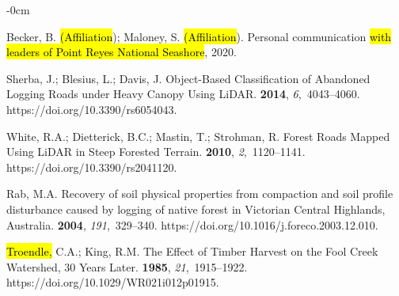 \documentclass[remotesensing,article,accept,pdftex,moreauthors]{Definitions/mdpi}
\begin{document}
\begin{adjustwidth}{-\extralength}{0cm}





\begin{thebibliography}{999}

Becker, B. \hl{(Affiliation}); %
Maloney, S.  \hl{(Affiliation}). %
\newblock Personal communication \hl{with leaders of Point Reyes National Seashore}, %
2020. 



Sherba, J.; Blesius, L.; Davis, J.
\newblock Object-Based Classification of Abandoned Logging Roads under Heavy
  Canopy Using LiDAR.
 {\bf 2014}, {\em
  6},~4043--4060.
\newblock https://doi.org/10.3390/rs6054043.

White, R.A.; Dietterick, B.C.; Mastin, T.; Strohman, R.
\newblock Forest Roads Mapped Using LiDAR in Steep Forested Terrain.
 {\bf 2010}, {\em
  2},~1120--1141.
\newblock https://doi.org/10.3390/rs2041120.

Rab, M.A.
\newblock Recovery of soil physical properties from compaction and soil profile
  disturbance caused by logging of native forest in Victorian Central
  Highlands, Australia.
 {\bf 2004}, {\em 191},~329--340.
\newblock https://doi.org/10.1016/j.foreco.2003.12.010.

\hl{Troendle,} %
 C.A.; King, R.M.
\newblock The Effect of Timber Harvest on the Fool Creek Watershed, 30 Years
  Later.
 {\bf 1985}, {\em 21},~1915--1922. https://doi.org/10.1029/WR021i012p01915.


\end{thebibliography}
\end{adjustwidth}
\end{document}

